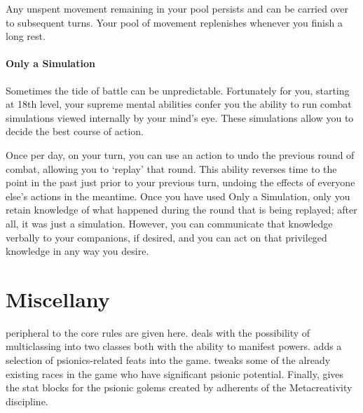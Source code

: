 Any unspent movement remaining in your pool persists
and can be carried over to subsequent turns.
Your pool of movement replenishes whenever you finish a long rest.

\subsubsection{Only a Simulation}
Sometimes the tide of battle can be unpredictable.
Fortunately for you,
starting at 18th level,
your supreme mental abilities confer you the ability to
run combat simulations viewed internally by your mind's eye.
These simulations allow you to decide the best course of action.

Once per day, on your turn,
you can use an action to undo the previous round of combat,
allowing you to `replay' that round.
This ability reverses time to the point in the past
just prior to your previous turn,
undoing the effects of everyone else's actions in the meantime.
Once you have used Only a Simulation,
only you retain knowledge of what happened during the round
that is being replayed; after all, it was just a simulation.
However, you can communicate that knowledge verbally to your companions,
if desired,
and you can act on that privileged knowledge
in any way you desire.

\chapter{Miscellany}
\label{chap:miscellany}
peripheral to the core rules are given here.
 deals with the
possibility of multiclassing into two classes both with
the ability to manifest powers.
 adds a selection of psionics-related
feats into the game.
 tweaks some of the already existing
races in the game who have significant psionic potential.
Finally,
 gives the stat blocks for the
psionic golems created by adherents of the
Metacreativity discipline.

